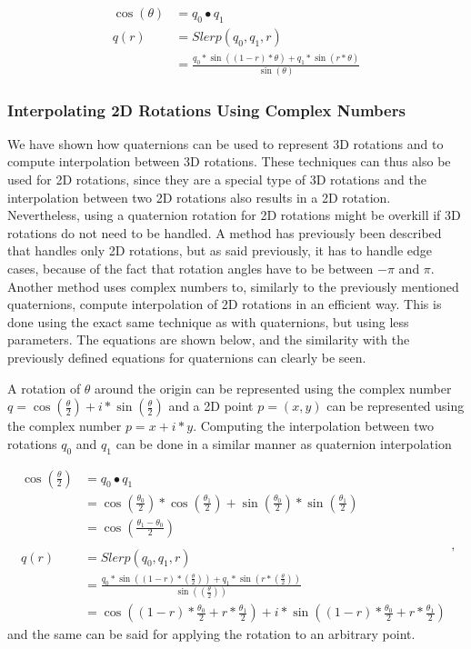 \begin{equation}
\begin{split}
    \cos(\theta)    & = q_0 \bullet q_1 \\
    q(r)            & = Slerp(q_0, q_1, r) \\
                    & = \frac{q_0 * \sin((1-r)*\theta) + q_1 * \sin(r*\theta)}{\sin(\theta)}
\end{split}
\end{equation}
    
\subsubsection{Interpolating 2D Rotations Using Complex Numbers}

We have shown how quaternions can be used to represent 3D rotations and to compute interpolation between 3D rotations. These techniques can thus also be used for 2D rotations, since they are a special type of 3D rotations and the interpolation between two 2D rotations also results in a 2D rotation. Nevertheless, using a quaternion rotation for 2D rotations might be overkill if 3D rotations do not need to be handled. A method has previously been described that handles only 2D rotations, but as said previously, it has to handle edge cases, because of the fact that rotation angles have to be between \( - \pi \) and \( \pi \). Another method uses complex numbers to, similarly to the previously mentioned quaternions, compute interpolation of 2D rotations in an efficient way. This is done using the exact same technique as with quaternions, but using less parameters. The equations are shown below, and the similarity with the previously defined equations for quaternions can clearly be seen.

A rotation of $\theta$ around the origin can be represented using the complex number \( q = \cos(\frac{\theta}{2}) + i*\sin(\frac{\theta}{2}) \) and a 2D point \( p = (x, y) \) can be represented using the complex number \( p = x + i*y \). Computing the interpolation between two rotations \( q_0 \) and \( q_1 \) can be done in a similar manner as quaternion interpolation

\begin{equation}
\begin{split}
\cos(\frac{\theta}{2})  &= q_0 \bullet q_1 \\
                        &= \cos(\frac{\theta_0}{2})*\cos(\frac{\theta_1}{2}) + \sin(\frac{\theta_0}{2})*\sin(\frac{\theta_1}{2}) \\
                        &= \cos(\frac{\theta_1 - \theta_0}{2}) \\
                        & \\
q(r)                &= Slerp(q_0, q_1, r) \\
                &= \frac{q_0 * \sin((1-r)*(\frac{\theta}{2})) + q_1 * \sin(r*(\frac{\theta}{2}))}{\sin((\frac{\theta}{2}))} \\
                &= \cos((1-r)*\frac{\theta_0}{2} + r*\frac{\theta_1}{2}) + i*\sin((1-r)*\frac{\theta_0}{2} + r*\frac{\theta_1}{2})
\end{split}, 
\end{equation}
and the same can be said for applying the rotation to an arbitrary point.

